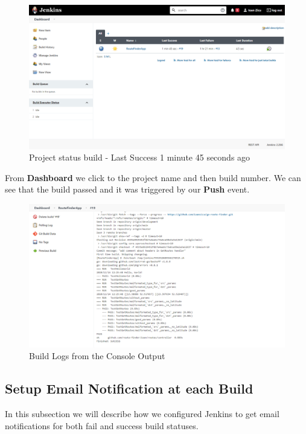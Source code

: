 \documentclass[12pt,a4paper,twoside]{article}
\begin{document}
\begin{figure}[h!]
    \centering
        \includegraphics[width=15cm]{images-aws/49-triggered-push.png}
        \caption{Project status build - Last Success 1 minute 45 seconds ago}
\end{figure}


From \textbf{Dashboard} we click to the project name and then build number. We can see that the build passed and it was triggered by our \textbf{Push} event.

\begin{figure}[H]
    \centering
        \includegraphics[width=15cm]{images-aws/50-triggered-push-logs.png}
        \caption{Build Logs from the Console Output}
\end{figure}





\subsection{Setup Email Notification at each Build}


In this subsection we will describe how we configured Jenkins to get email notifications for both fail and success build statuses.
\end{document}
